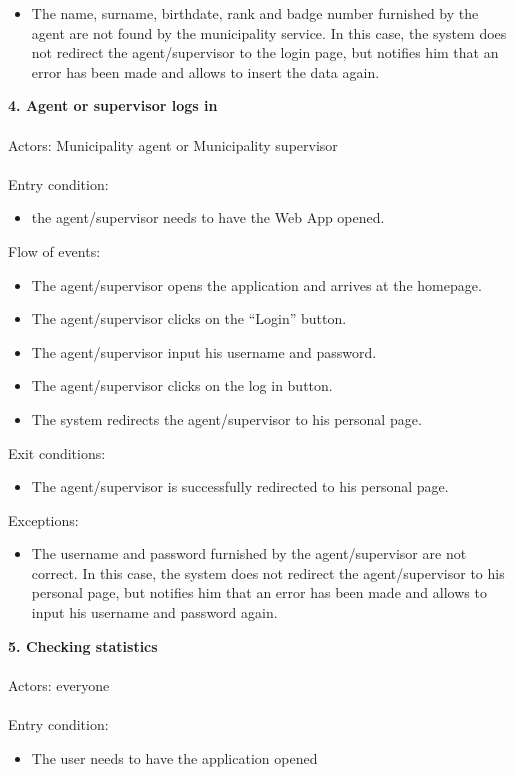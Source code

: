 \documentclass[a4paper]{report}
\begin{document}
 \begin{itemize}
 \item The name, surname, birthdate, rank and badge number furnished by the agent are not found by the municipality service. In this case, the system does not redirect the agent/supervisor to the login page, but notifies him that an error has been made and allows to insert the data again.
\end{itemize}
\textbf{4. Agent or supervisor logs in }\label{uc:4}
\\
\\
Actors: Municipality agent or Municipality supervisor \\ \\
Entry condition:
\begin{itemize}
\item the agent/supervisor needs to have the Web App opened.
\end{itemize}
Flow of events:
\begin{itemize}
\item The agent/supervisor opens the application and arrives at the homepage.
\item The agent/supervisor clicks on the “Login” button.
\item The agent/supervisor input his username and password.
\item	The agent/supervisor clicks on the log in button.
\item	The system redirects the agent/supervisor to his personal page.
\end{itemize}
Exit conditions:
\begin{itemize}
\item The agent/supervisor is successfully redirected to his personal page.
 \end{itemize}
Exceptions: 
 \begin{itemize}
 \item The username and password furnished by the agent/supervisor are not correct. In this case, the system does not redirect the agent/supervisor to his personal page, but notifies him that an error has been made and allows to input his username and password again.
\end{itemize}
\textbf{5. Checking statistics}\label{uc:5}
\\ \\
Actors: everyone \\ \\
Entry condition: 
\begin{itemize}
\item The user needs to have the application opened
\end{itemize}
\end{document}
